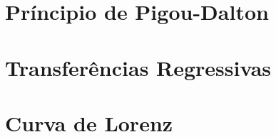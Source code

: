 \documentclass[
]{book}
\begin{document}
\hypertarget{pruxedncipio-de-pigou-dalton}{%
\section{Príncipio de Pigou-Dalton}\label{pruxedncipio-de-pigou-dalton}}

\hypertarget{transferuxeancias-regressivas}{%
\section{Transferências Regressivas}\label{transferuxeancias-regressivas}}

\hypertarget{curva-de-lorenz}{%
\section{Curva de Lorenz}\label{curva-de-lorenz}}
\end{document}
